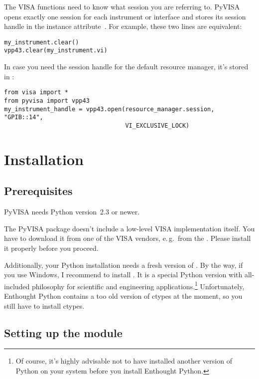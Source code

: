 \documentclass{howto}
\begin{document}
The VISA functions need to know what session you are referring to.  PyVISA
opens exactly one session for each instrument or interface and stores its
session handle in the instance attribute~.  For example, these two
lines are equivalent:
\begin{verbatim}
my_instrument.clear()
vpp43.clear(my_instrument.vi)
\end{verbatim}

In case you need the session handle for the default resource manager, it's
stored in :
\begin{verbatim}
from visa import *
from pyvisa import vpp43
my_instrument_handle = vpp43.open(resource_manager.session, "GPIB::14",
                                  VI_EXCLUSIVE_LOCK)
\end{verbatim}


\section{Installation}

\subsection{Prerequisites}

PyVISA needs Python version~2.3 or newer.

The PyVISA package doesn't include a low-level VISA implementation itself.  You
have to download it from one of the VISA vendors, e.\,g.\ from the
.  Please install
it properly before you proceed.

Additionally, your Python installation needs a fresh version of
.  By the way,
if you use Windows, I recommend to install .  It is a special Python version
with all-included philosophy for scientific and engineering
applications.\footnote{Of course, it's highly advisable not to have installed
  another version of Python on your system before you install Enthought
  Python.}  Unfortunately, Enthought Python contains a too old version of
ctypes at the moment, so you still have to install ctypes.


\subsection{Setting up the module}
\end{document}
